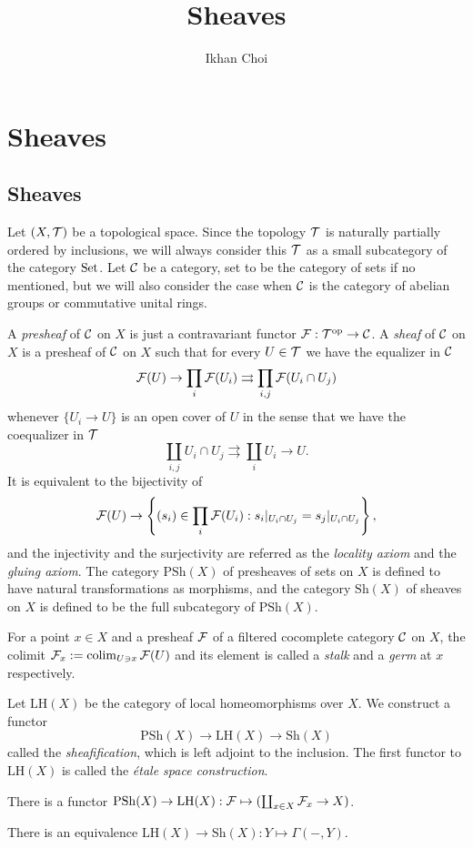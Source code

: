 \documentclass{../../large}
\newcommand{\PSh}{\mathrm{PSh}}
\newcommand{\Sh}{\mathrm{Sh}}
\begin{document}
\title{Sheaves}
\author{Ikhan Choi}
\maketitle
\tableofcontents




\part{Sheaves}

\chapter{Sheaves}




\begin{prb}[Sheaves]
Let $(X,\mathcal{T})$ be a topological space.
Since the topology $\mathcal{T}$ is naturally partially ordered by inclusions, we will always consider this $\mathcal{T}$ as a small subcategory of the category $\operatorname{Set}$.
Let $\mathcal{C}$ be a category, set to be the category of sets if no mentioned, but we will also consider the case when $\mathcal{C}$ is the category of abelian groups or commutative unital rings.

A \emph{presheaf} of $\mathcal{C}$ on $X$ is just a contravariant functor $\mathcal{F}:\mathcal{T}^{\mathrm{op}}\to\mathcal{C}$.
A \emph{sheaf} of $\mathcal{C}$ on $X$ is a presheaf of $\mathcal{C}$ on $X$ such that for every $U\in\mathcal{T}$ we have the equalizer in $\mathcal{C}$
\[\mathcal{F}(U)\to\prod_i\mathcal{F}(U_i)\rightrightarrows\prod_{i,j}\mathcal{F}(U_i\cap U_j)\]
whenever $\{U_i\to U\}$ is an open cover of $U$ in the sense that we have the coequalizer in $\mathcal{T}$
\[\coprod_{i,j}U_i\cap U_j\rightrightarrows\coprod_iU_i\to U.\]
It is equivalent to the bijectivity of
\[\mathcal{F}(U)\to\left\{(s_i)\in\prod_i\mathcal{F}(U_i):s_i|_{U_i\cap U_j}=s_j|_{U_i\cap U_j}\right\},\]
and the injectivity and the surjectivity are referred as the \emph{locality axiom} and the \emph{gluing axiom}.
The category $\PSh(X)$ of presheaves of sets on $X$ is defined to have natural transformations as morphisms, and the category $\Sh(X)$ of sheaves on $X$ is defined to be the full subcategory of $\PSh(X)$.


For a point $x\in X$ and a presheaf $\mathcal{F}$ of a filtered cocomplete category $\mathcal{C}$ on $X$, the colimit $\mathcal{F}_x:=\operatorname*{colim}_{U\ni x}\mathcal{F}(U)$ and its element is called a \emph{stalk} and a \emph{germ} at $x$ respectively.


Let $\mathrm{LH}(X)$ be the category of local homeomorphisms over $X$.
We construct a functor
\[\PSh(X)\to\mathrm{LH}(X)\to\Sh(X)\]
called the \emph{sheafification}, which is left adjoint to the inclusion.
The first functor to $\mathrm{LH}(X)$ is called the \emph{\'etale space construction}.
\begin{parts}
\item There is a functor $\PSh(X)\to\mathrm{LH}(X):\cF\mapsto(\coprod_{x\in X}\cF_x\to X)$.
\item There is an equivalence $\mathrm{LH}(X)\to\Sh(X):Y\mapsto\Gamma(-,Y)$.
\end{parts}
\end{prb}
\end{document}
